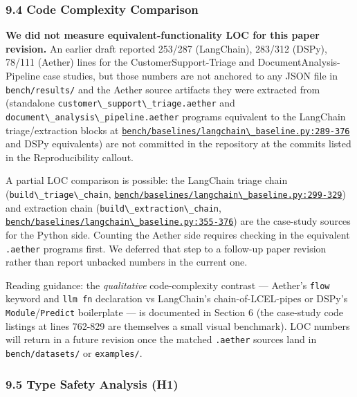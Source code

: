 \documentclass[
]{article}
\newcommand{\passthrough}[1]{#1}
\begin{document}
\subsubsection{9.4 Code Complexity
Comparison}\label{code-complexity-comparison}

\textbf{We did not measure equivalent-functionality LOC for this paper
revision.} An earlier draft reported 253/287 (LangChain), 283/312
(DSPy), 78/111 (Aether) lines for the CustomerSupport-Triage and
DocumentAnalysis-Pipeline case studies, but those numbers are not
anchored to any JSON file in \passthrough{\lstinline!bench/results/!}
and the Aether source artifacts they were extracted from (standalone
\passthrough{\lstinline!customer\_support\_triage.aether!} and
\passthrough{\lstinline!document\_analysis\_pipeline.aether!} programs
equivalent to the LangChain triage/extraction blocks at
\href{../bench/baselines/langchain_baseline.py\#L289-L376}{\passthrough{\lstinline!bench/baselines/langchain\_baseline.py:289-376!}}
and DSPy equivalents) are not committed in the repository at the commits
listed in the Reproducibility callout.

A partial LOC comparison is possible: the LangChain triage chain
(\passthrough{\lstinline!build\_triage\_chain!},
\href{../bench/baselines/langchain_baseline.py\#L299-L329}{\passthrough{\lstinline!bench/baselines/langchain\_baseline.py:299-329!}})
and extraction chain
(\passthrough{\lstinline!build\_extraction\_chain!},
\href{../bench/baselines/langchain_baseline.py\#L355-L376}{\passthrough{\lstinline!bench/baselines/langchain\_baseline.py:355-376!}})
are the case-study sources for the Python side. Counting the Aether side
requires checking in the equivalent \passthrough{\lstinline!.aether!}
programs first. We deferred that step to a follow-up paper revision
rather than report unbacked numbers in the current one.

Reading guidance: the \emph{qualitative} code-complexity contrast ---
Aether's \passthrough{\lstinline!flow!} keyword and
\passthrough{\lstinline!llm fn!} declaration vs LangChain's
chain-of-LCEL-pipes or DSPy's
\passthrough{\lstinline!Module!}/\passthrough{\lstinline!Predict!}
boilerplate --- is documented in Section 6 (the case-study code listings
at lines 762-829 are themselves a small visual benchmark). LOC numbers
will return in a future revision once the matched
\passthrough{\lstinline!.aether!} sources land in
\passthrough{\lstinline!bench/datasets/!} or
\passthrough{\lstinline!examples/!}.

\subsubsection{9.5 Type Safety Analysis
(H1)}\label{type-safety-analysis-h1}
\end{document}
